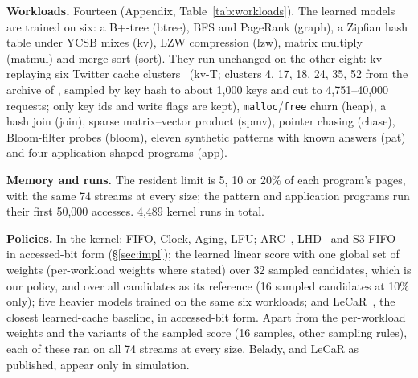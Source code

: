 \documentclass{article}
\newcommand{\clock}{Clock\xspace}
\newcommand{\belady}{Belady\xspace}
\newcommand{\finding}[1]{\textbf{#1}\hspace{0.4em}}
\begin{document}
\finding{Workloads.} Fourteen (Appendix, Table~\ref{tab:workloads}). The learned models
are trained on six: a B+-tree (btree), BFS and PageRank (graph), a Zipfian hash table
under YCSB mixes (kv), LZW compression (lzw), matrix multiply (matmul) and merge sort
(sort). They run unchanged on the other eight: kv replaying six Twitter cache
clusters~\citep{yang2020twitter} (kv-T; clusters 4, 17, 18, 24, 35, 52 from the archive of
\citet{zussman2025cacheext}, sampled by key hash to about 1,000 keys and cut to
4,751--40,000 requests; only key ids and write flags are kept), \texttt{malloc}/\texttt{free}
churn (heap), a hash join (join), sparse matrix--vector product (spmv), pointer chasing
(chase), Bloom-filter probes (bloom), eleven synthetic patterns with known answers (pat)
and four application-shaped programs (app).

\finding{Memory and runs.} The resident limit is 5, 10 or 20\% of each program's pages,
with the same 74 streams at every size; the pattern and application programs run their
first 50,000 accesses. 4,489 kernel runs in total.

\finding{Policies.} In the kernel: FIFO, \clock, Aging, LFU; ARC~\citep{megiddo2003arc},
LHD~\citep{beckmann2018lhd} and S3-FIFO~\citep{yang2023s3fifo} in accessed-bit form
(\S\ref{sec:impl}); the learned linear score with one global set of weights (per-workload
weights where stated) over 32 sampled candidates, which is our policy, and over all
candidates as its reference (16 sampled candidates at 10\% only); five heavier models
trained on the same six workloads; and LeCaR~\citep{vietri2018lecar}, the closest
learned-cache baseline, in accessed-bit form. Apart from the per-workload weights and the
variants of the sampled score (16 samples, other sampling rules), each of these ran on all
74 streams at every size. \belady, and LeCaR as published, appear only in simulation.
\end{document}

